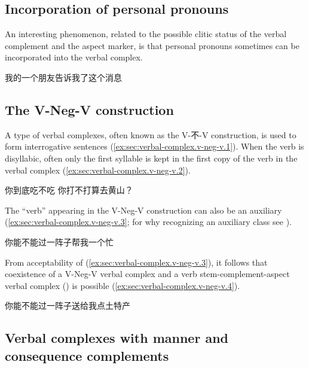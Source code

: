 \documentclass[UTF8, a4paper, oneside, scheme=plain, 12pt]{ctexrep}
\begin{document}
\subsection{Incorporation of personal pronouns}\label{sec:verbal-complex.v-c-a.incorporation}

An interesting phenomenon, related to the possible clitic status of the verbal complement and the aspect marker,
is that personal pronouns sometimes can be incorporated into the verbal complex.

\begin{exe}
    \ex 我的一个朋友告诉我了这个消息
\end{exe}

\subsection{The V-Neg-V construction}\label{sec:verbal-complex.v-neg-v}

A type of verbal complexes, often known as the V-不-V construction,
is used to form interrogative sentences
(\ref{ex:sec:verbal-complex.v-neg-v.1}).
When the verb is disyllabic, often only the first syllable is kept in the first copy of the verb in the verbal complex
(\ref{ex:sec:verbal-complex.v-neg-v.2}).

\begin{exe}
    \ex\label{ex:sec:verbal-complex.v-neg-v.1} 你到底吃不吃
    \ex\label{ex:sec:verbal-complex.v-neg-v.2} 你打不打算去黄山？
\end{exe}

The ``verb'' appearing in the V-Neg-V construction
can also be an auxiliary (\ref{ex:sec:verbal-complex.v-neg-v.3};
for why recognizing an auxiliary class see ).

\begin{exe}
    \ex\label{ex:sec:verbal-complex.v-neg-v.3} 你能不能过一阵子帮我一个忙
\end{exe}

From acceptability of (\ref{ex:sec:verbal-complex.v-neg-v.3}),
it follows that coexistence of a V-Neg-V verbal complex
and a verb stem-complement-aspect verbal complex ()
is possible (\ref{ex:sec:verbal-complex.v-neg-v.4}).

\begin{exe}
    \ex\label{ex:sec:verbal-complex.v-neg-v.4} 你能不能过一阵子送给我点土特产
\end{exe}

\subsection{Verbal complexes with manner and consequence complements}
\label{sec:verbal-complex.de}
\end{document}
